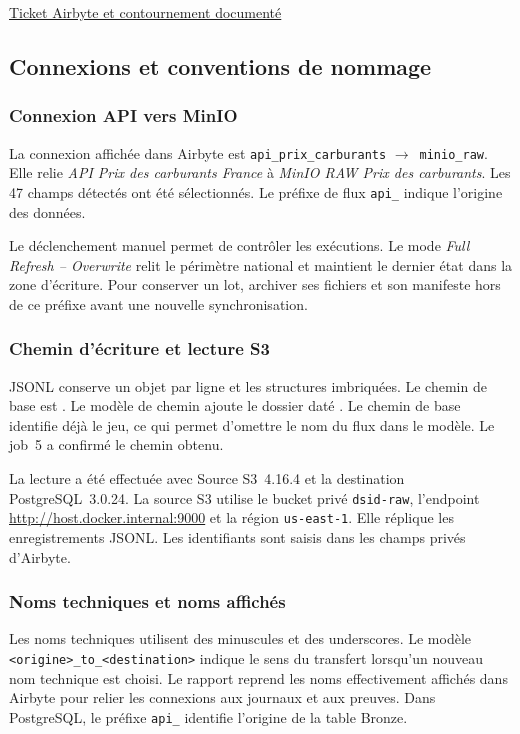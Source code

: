 \documentclass[11pt,a4paper]{article}
\newcommand{\code}[1]{\texttt{#1}}
\newcommand{\flux}{\ensuremath{\rightarrow}}
\begin{document}
\href{https://github.com/airbytehq/airbyte/issues/84928}{Ticket Airbyte et contournement documenté}

\subsection{Connexions et conventions de nommage}

\subsubsection{Connexion API vers MinIO}

La connexion affichée dans Airbyte est
\code{api\_prix\_carburants} \flux\ \code{minio\_raw}.
Elle relie \emph{API Prix des carburants France} à
\emph{MinIO RAW Prix des carburants}. Les 47 champs détectés
ont été sélectionnés. Le préfixe de flux \code{api\_} indique
l'origine des données.

Le déclenchement manuel permet de contrôler les exécutions.
Le mode \emph{Full Refresh -- Overwrite} relit le périmètre
national et maintient le dernier état dans la zone d'écriture.
Pour conserver un lot, archiver ses fichiers et son manifeste
hors de ce préfixe avant une nouvelle synchronisation.

\subsubsection{Chemin d'écriture et lecture S3}

JSONL conserve un objet par ligne et les structures imbriquées.
Le chemin de base est . Le modèle
de chemin ajoute le dossier daté .
Le chemin de base identifie déjà le jeu, ce qui permet d'omettre
le nom du flux dans le modèle. Le job~5 a confirmé le chemin obtenu.

La lecture a été effectuée avec Source S3~4.16.4 et la destination
PostgreSQL~3.0.24. La source S3 utilise le bucket privé
\code{dsid-raw}, l'endpoint \url{http://host.docker.internal:9000}
et la région \code{us-east-1}. Elle réplique les enregistrements
JSONL. Les identifiants sont saisis dans les champs privés d'Airbyte.

\subsubsection{Noms techniques et noms affichés}

Les noms techniques utilisent des minuscules et des underscores.
Le modèle \verb|<origine>_to_<destination>| indique le sens du
transfert lorsqu'un nouveau nom technique est choisi. Le rapport
reprend les noms effectivement affichés dans Airbyte pour relier
les connexions aux journaux et aux preuves. Dans PostgreSQL,
le préfixe \code{api\_} identifie l'origine de la table Bronze.
\end{document}
